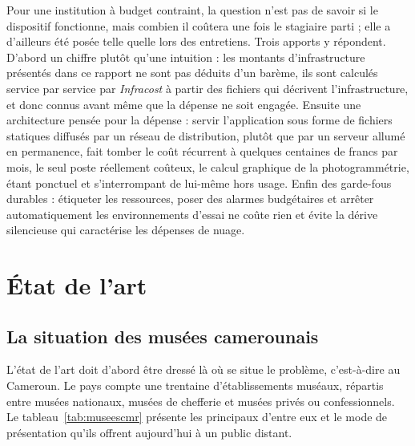 Pour une institution à budget contraint, la question n'est pas de savoir si le
dispositif fonctionne, mais combien il coûtera une fois le stagiaire parti ; elle
a d'ailleurs été posée telle quelle lors des entretiens. Trois apports y
répondent. D'abord un chiffre plutôt qu'une intuition : les montants
d'infrastructure présentés dans ce rapport ne sont pas déduits d'un barème, ils
sont calculés service par service par \emph{Infracost} à partir des fichiers qui
décrivent l'infrastructure, et donc connus avant même que la dépense ne soit
engagée. Ensuite une architecture pensée pour la dépense : servir l'application
sous forme de fichiers statiques diffusés par un réseau de distribution, plutôt
que par un serveur allumé en permanence, fait tomber le coût récurrent à
quelques centaines de francs par mois, le seul poste réellement coûteux, le
calcul graphique de la photogrammétrie, étant ponctuel et s'interrompant de
lui-même hors usage. Enfin des garde-fous durables : étiqueter les ressources,
poser des alarmes budgétaires et arrêter automatiquement les environnements
d'essai ne coûte rien et évite la dérive silencieuse qui caractérise les
dépenses de nuage.

\section{État de l'art}
\label{sec:etatart}

\subsection{La situation des musées camerounais}

L'état de l'art doit d'abord être dressé là où se situe le problème, c'est-à-dire
au Cameroun. Le pays compte une trentaine d'établissements muséaux, répartis
entre musées nationaux, musées de chefferie et musées privés ou confessionnels.
Le tableau~\ref{tab:museescmr} présente les principaux d'entre eux et le mode
de présentation qu'ils offrent aujourd'hui à un public distant.


